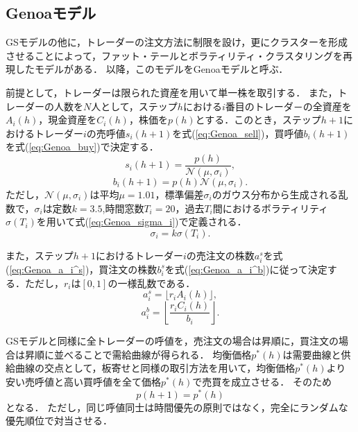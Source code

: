 \documentclass[titlepage]{jsreport}
\begin{document}
\subsection{Genoaモデル}
GSモデルの他に，トレーダーの注文方法に制限を設け，更にクラスターを形成させることによって，ファット・テールとボラティリティ・クラスタリングを再現したモデルがある\cite{Genoa}．
以降，このモデルをGenoaモデルと呼ぶ．

前提として，トレーダーは限られた資産を用いて単一株を取引する．
また，トレーダーの人数を$N$人として，ステップ$h$における$i$番目のトレーダ－の全資産を$A_i(h)$，現金資産を$C_i(h)$，株価を$p(h)$とする．このとき，ステップ$h + 1$におけるトレーダー$i$の売呼値$s_i(h + 1)$を式(\ref{eq:Genoa_sell})，買呼値$b_i(h + 1)$を式(\ref{eq:Genoa_buy})で決定する．
\begin{equation}
    s_i(h + 1) = \frac{p(h)}{\mathcal{N}(\mu, \sigma_i)}, \label{eq:Genoa_sell}
\end{equation}
\begin{equation}
    b_i(h + 1) = p(h) \mathcal{N}(\mu, \sigma_i). \label{eq:Genoa_buy}
\end{equation}
ただし，$\mathcal{N}(\mu, \sigma_i)$は平均$\mu = 1.01$，標準偏差$\sigma_i$のガウス分布から生成される乱数で，$\sigma_i$は定数$k = 3.5$,時間窓数$T_i = 20$，過去$T_i$間におけるボラティリティ$\sigma(T_i)$を用いて式(\ref{eq:Genoa_sigma_i})で定義される．
\begin{equation}
    \sigma_i = k \sigma(T_i). \label{eq:Genoa_sigma_i}
\end{equation}

また，ステップ$h + 1$におけるトレーダー$i$の売注文の株数$a_i^s$を式(\ref{eq:Genoa_a_i^s})，買注文の株数$b_i^s$を式(\ref{eq:Genoa_a_i^b})に従って決定する．ただし，$r_i$は$[0, 1]$の一様乱数である．
\begin{equation}
    a_i^s = \lfloor r_i A_i(h) \rfloor, \label{eq:Genoa_a_i^s}
\end{equation}
\begin{equation}
    a_i^b = \left\lfloor \frac{r_i C_i(h)}{b_i} \right\rfloor. \label{eq:Genoa_a_i^b}
\end{equation}

GSモデルと同様に全トレーダーの呼値を，売注文の場合は昇順に，買注文の場合は昇順に並べることで需給曲線が得られる．
均衡価格$p^*(h)$は需要曲線と供給曲線の交点として，板寄せと同様の取引方法を用いて，均衡価格$p^*(h)$より安い売呼値と高い買呼値を全て価格$p^*(h)$で売買を成立させる．
そのため
\begin{equation}
    p(h + 1) = p^*(h) \label{eq:Genoa_price}
\end{equation}
となる．
ただし，同じ呼値同士は時間優先の原則ではなく，完全にランダムな優先順位で対当させる．
\end{document}
